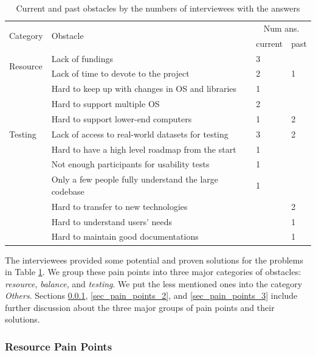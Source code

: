 \documentclass[preprint,12pt,authoryear]{elsarticle}
\begin{document}
\begin{table}[ht]
\centering
\begin{tabular}{llll}
\hline
\multirow{2}{*}{Category} & \multirow{2}{*}{Obstacle} & \multicolumn{2}{c}{Num ans.} \\ \cline{3-4} 
 &  & current & past \\ \hline
\multirow{2}{*}{Resource} & Lack of fundings & 3 &  \\
 & Lack of time to devote to the project & 2 & 1 \\ \hdashline
\multirow{3}{*}{Balance} & Hard to keep up with changes in OS and libraries & 1 &  \\
 & Hard to support multiple OS & 2 &  \\
 & Hard to support lower-end computers & 1 & 2 \\ \hdashline
Testing & Lack of access to real-world datasets for testing & 3 & 2 \\ \hdashline
\multirow{7}{*}{Others}
 & Hard to have a high level roadmap from the start & 1 &  \\
 & Not enough participants for usability tests & 1 &  \\
 & Only a few people fully understand the large codebase & 1 &  \\
 & Hard to transfer to new technologies & & 2 \\
 & Hard to understand users' needs & & 1 \\
 & Hard to maintain good documentations & & 1 \\ \hline
\end{tabular}
\caption{\label{tab_obstacles}Current and past obstacles by the numbers of interviewees with the answers}
\end{table}

The interviewees provided some potential and proven solutions for the problems
in Table \ref{tab_obstacles}. We group these pain points into three major
categories of obstacles: \textit{resource}, \textit{balance}, and
\textit{testing}. We put the less mentioned ones into the category
\textit{Others}. Sections \ref{sec_pain_points_1}, \ref{sec_pain_points_2}, and
\ref{sec_pain_points_3} include further discussion about the three major groups
of pain points and their solutions.

\subsubsection{Resource Pain Points} \label{sec_pain_points_1}
\end{document}
